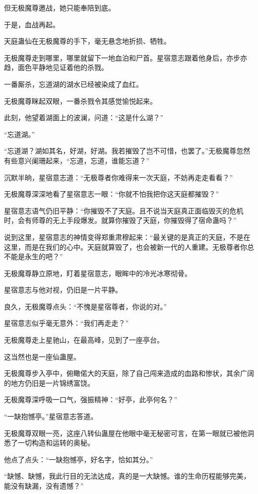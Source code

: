 \begin{this_body}
但无极魔尊邀战，她只能奉陪到底。

于是，血战再起。

天庭蛊仙在无极魔尊的手下，毫无悬念地折损、牺牲。

无极魔尊走到哪里，哪里就留下一地血泊和尸首。星宿意志跟着他身后，亦步亦趋，面色平静地见证着他的杀戮。

一番厮杀，忘道湖的湖水已经被染成了血红。

无极魔尊眯起双眼，一番杀戮令其感觉愉悦起来。

此刻，他望着湖面上的波澜，问道：“这是什么湖？”

“忘道湖。”

“忘道湖？湖如其名，好湖，好湖。我若摧毁了岂不可惜，也罢了。”无极魔尊忽然有些意兴阑珊起来，“忘道，忘道，谁能忘道？”

沉默半晌，星宿意志道：“无极尊者你难得来一次天庭，不妨再走走看看？”

无极魔尊深深地看了星宿意志一眼：“你就不怕我把你这天庭都摧毁？”

星宿意志语气仍旧平静：“你摧毁不了天庭。且不说当天庭真正面临毁灭的危机时，会有师尊的无上手段爆发。就算你摧毁了天庭，你摧毁得了宿命蛊吗？”

说到这里，星宿意志的神情变得郑重肃穆起来：“最关键的是真正的天庭，不是在这里，而是在我们的心中。天庭就算毁了，也会被新一代的人重建。无极尊者你总不能是永生的吧？”

无极魔尊静立原地，盯着星宿意志，眼眸中的冷光冰寒彻骨。

星宿意志与他对视，仍旧是一片平静。

良久，无极魔尊点头：“不愧是星宿尊者，你说的对。”

星宿意志似乎毫无意外：“我们再走走？”

无极魔尊走上星驰山，在最高峰，见到了一座亭台。

这当然也是一座仙蛊屋。

无极魔尊步入亭中，俯瞰偌大的天庭，除了自己闯来造成的血路和惨状，其余广阔的地方仍旧是一片锦绣富饶。

无极魔尊深呼吸一口气，强振精神：“好亭，此亭何名？”

“一缺抱憾亭。”星宿意志答道。

无极魔尊双眼一亮，这座八转仙蛊屋在他眼中毫无秘密可言，在第一眼就已被他洞悉了一切构造和运转的奥秘。

他点了点头：“一缺抱憾亭，好名字，恰如其分。”

“缺憾、缺憾，我此行目的无法达成，真的是一大缺憾。谁的生命历程能够完美，能没有缺漏，没有遗憾？”


\end{this_body}
